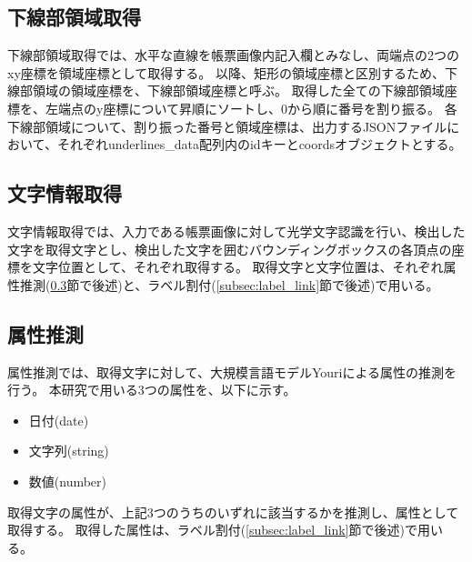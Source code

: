 \subsection{下線部領域取得}\label{subsec:underline_coords_obtainment}
下線部領域取得では、水平な直線を帳票画像内記入欄とみなし、両端点の2つのxy座標を領域座標として取得する。
以降、矩形の領域座標と区別するため、下線部領域の領域座標を、下線部領域座標と呼ぶ。
取得した全ての下線部領域座標を、左端点のy座標について昇順にソートし、0から順に番号を割り振る。
各下線部領域について、割り振った番号と領域座標は、出力するJSONファイルにおいて、それぞれunderlines\_data配列内のidキーとcoordsオブジェクトとする。

\subsection{文字情報取得}\label{subsec:char_information_obtainment}
文字情報取得では、入力である帳票画像に対して光学文字認識を行い、検出した文字を取得文字とし、検出した文字を囲むバウンディングボックスの各頂点の座標を文字位置として、それぞれ取得する。
取得文字と文字位置は、それぞれ属性推測(\ref{subsec:att_prediction}節で後述)と、ラベル割付(\ref{subsec:label_link}節で後述)で用いる。

\subsection{属性推測}\label{subsec:att_prediction}
属性推測では、取得文字に対して、大規模言語モデルYouriによる属性の推測を行う。
本研究で用いる3つの属性を、以下に示す。

\begin{itemize}
    \item 日付(date)
    \item 文字列(string)
    \item 数値(number)
\end{itemize}

取得文字の属性が、上記3つのうちのいずれに該当するかを推測し、属性として取得する。
取得した属性は、ラベル割付(\ref{subsec:label_link}節で後述)で用いる。

